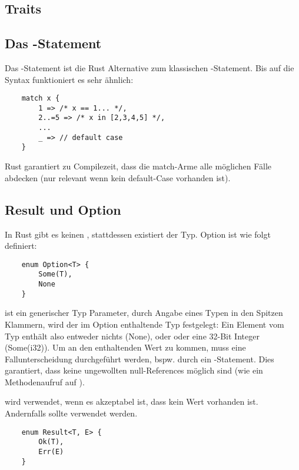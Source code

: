 \subsection{Traits}

\subsection{Das -Statement}

Das -Statement ist die Rust Alternative zum klassischen -Statement. Bis auf die Syntax funktioniert es sehr ähnlich:

\begin{verbatim}
    match x {
        1 => /* x == 1... */,
        2..=5 => /* x in [2,3,4,5] */,
        ...
        _ => // default case
    }
\end{verbatim}

Rust garantiert zu Compilezeit, dass die match-Arme alle möglichen Fälle abdecken (nur relevant wenn kein default-Case vorhanden ist).

\subsection{Result und Option}

In Rust gibt es keinen , stattdessen existiert der  Typ. Option ist wie folgt definiert:

\begin{verbatim}
    enum Option<T> {
        Some(T),
        None
    }
\end{verbatim}

 ist ein generischer Typ Parameter, durch Angabe eines Typen in den Spitzen Klammern, wird der im Option enthaltende Typ festgelegt:
Ein Element vom Typ  enthält also entweder nichts (None), oder oder eine 32-Bit Integer (Some(i32)). Um an den enthaltenden Wert zu kommen, muss eine Fallunterscheidung durchgeführt werden, bspw. durch ein -Statement. Dies garantiert, dass keine ungewollten null-References möglich sind (wie \zB ein Methodenaufruf auf ).

 wird verwendet, wenn es akzeptabel ist, dass kein Wert vorhanden ist. Andernfalls sollte  verwendet werden.

\begin{verbatim}
    enum Result<T, E> {
        Ok(T),
        Err(E)
    }
\end{verbatim}

